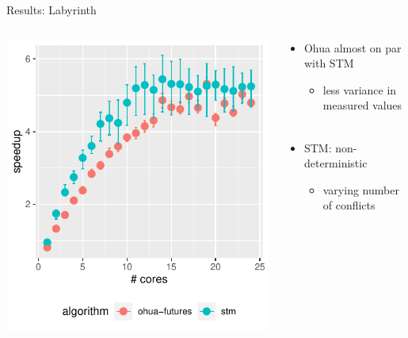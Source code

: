 \documentclass[aspectratio=169, usenames, dvipsnames]{beamer}
\begin{document}
\begin{frame}{Results: Labyrinth}
    \begin{columns}%
        \begin{column}{0.5\textwidth}
            \centering
            \includegraphics[width=\textwidth,height=.65\textheight,keepaspectratio]{img/results/labyrinth++}
        \end{column}%
        \begin{column}{0.5\textwidth}
            \begin{itemize}
                \item<2-> Ohua almost on par with STM
                \begin{itemize}
                    \item<3-> less variance in measured values\\ \ 
                \end{itemize}
                \item<4-> STM: non-deterministic
                \begin{itemize}
                    \item<5-> varying number of conflicts
                \end{itemize}
            \end{itemize}
        \end{column}
    \end{columns}
\end{frame}
\end{document}
